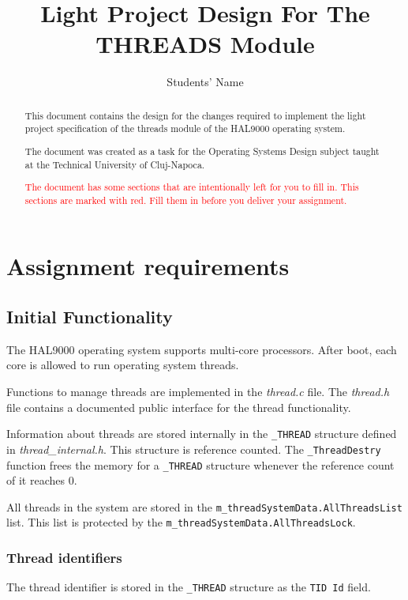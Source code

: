 \documentclass[a4paper,12pt]{report}
\title{Light Project Design For The THREADS Module}
\author{Students' Name}
\begin{document}
\begin{abstract}
    This document contains the design for the changes required to implement the light project specification  of the threads module of the HAL9000 operating system. 
    
    The document was created as a task for the Operating Systems Design subject taught at the Technical University of Cluj-Napoca. 
    
    \textcolor{red}{The document has some sections that are intentionally left for you to fill in. This sections are marked with red. Fill them in before you deliver your assignment.}
    
\end{abstract}



\maketitle

\chapter{Assignment requirements}

\section{Initial Functionality}
    The HAL9000 operating system supports multi-core processors. After boot, each core is allowed to run operating system threads. 
    
    Functions to manage threads are implemented in the \textit{thread.c} file. The \textit{thread.h} file contains a documented public interface for the thread functionality.
    
    Information about threads are stored internally in the \lstinline|_THREAD| structure defined in \textit{thread\_internal.h}. This structure is reference counted. The \lstinline|_ThreadDestry| function frees the memory for a \lstinline|_THREAD| structure whenever the reference count of it reaches 0.
    
    All threads in the system are stored in the \lstinline|m_threadSystemData.AllThreadsList| list. This list is protected by the \lstinline|m_threadSystemData.AllThreadsLock|.

\subsection{Thread identifiers}
    The thread identifier is stored in the \lstinline|_THREAD| structure as the \lstinline|TID Id| field. 
    
\end{document}
